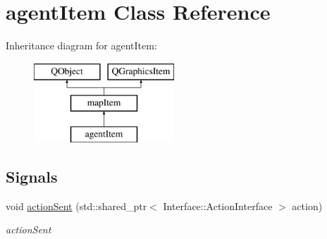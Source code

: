 \hypertarget{classagent_item}{\section{agent\-Item Class Reference}
\label{classagent_item}
}
Inheritance diagram for agent\-Item\-:\begin{figure}[H]
\begin{center}
\leavevmode
\includegraphics[height=3.000000cm]{classagent_item}
\end{center}
\end{figure}
\subsection*{Signals}
\begin{DoxyCompactItemize}
\item 
void \hyperlink{classagent_item_a653a5f546c032b56e20c815b5ed7ec6b}{action\-Sent} (std\-::shared\-\_\-ptr$<$ Interface\-::\-Action\-Interface $>$ action)
\begin{DoxyCompactList}\small\item\em action\-Sent \end{DoxyCompactList}\end{DoxyCompactItemize}

